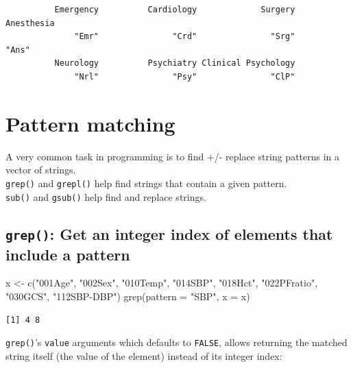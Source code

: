 \documentclass[
]{book}
\newenvironment{Shaded}{\begin{snugshade}}{\end{snugshade}}
\newcommand{\AttributeTok}[1]{\textcolor[rgb]{0.77,0.63,0.00}{#1}}
\newcommand{\FunctionTok}[1]{\textcolor[rgb]{0.00,0.00,0.00}{#1}}
\newcommand{\NormalTok}[1]{#1}
\newcommand{\OtherTok}[1]{\textcolor[rgb]{0.56,0.35,0.01}{#1}}
\newcommand{\StringTok}[1]{\textcolor[rgb]{0.31,0.60,0.02}{#1}}
\begin{document}
\begin{verbatim}
          Emergency          Cardiology             Surgery          Anesthesia 
              "Emr"               "Crd"               "Srg"               "Ans" 
          Neurology          Psychiatry Clinical Psychology 
              "Nrl"               "Psy"               "ClP" 
\end{verbatim}

\hypertarget{pattern-matching}{%
\section{Pattern matching}\label{pattern-matching}}

A very common task in programming is to find +/- replace string patterns in a vector of strings.\\
\texttt{grep()} and \texttt{grepl()} help find strings that contain a given pattern.\\
\texttt{sub()} and \texttt{gsub()} help find and replace strings.

\hypertarget{grep-get-an-integer-index-of-elements-that-include-a-pattern}{%
\subsection{\texorpdfstring{\texttt{grep()}: Get an integer index of elements that include a pattern}{grep(): Get an integer index of elements that include a pattern}}\label{grep-get-an-integer-index-of-elements-that-include-a-pattern}}

\begin{Shaded}
\begin{Highlighting}[]
\NormalTok{x }\OtherTok{\textless{}{-}} \FunctionTok{c}\NormalTok{(}\StringTok{"001Age"}\NormalTok{, }\StringTok{"002Sex"}\NormalTok{, }\StringTok{"010Temp"}\NormalTok{, }\StringTok{"014SBP"}\NormalTok{, }\StringTok{"018Hct"}\NormalTok{, }\StringTok{"022PFratio"}\NormalTok{, }\StringTok{"030GCS"}\NormalTok{, }\StringTok{"112SBP{-}DBP"}\NormalTok{)}
\FunctionTok{grep}\NormalTok{(}\AttributeTok{pattern =} \StringTok{"SBP"}\NormalTok{, }\AttributeTok{x =}\NormalTok{ x)}
\end{Highlighting}
\end{Shaded}

\begin{verbatim}
[1] 4 8
\end{verbatim}

\texttt{grep()}'s \texttt{value} arguments which defaults to \texttt{FALSE}, allows returning the matched string itself (the value of the element) instead of its integer index:
\end{document}
